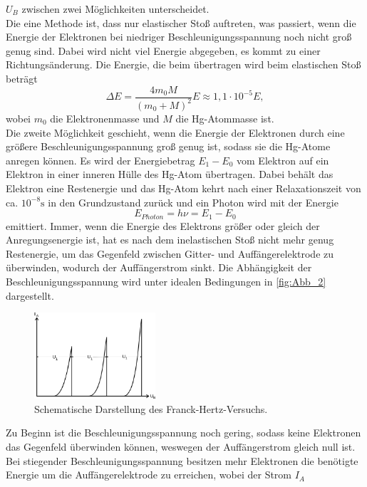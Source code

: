 $U_B$ zwischen zwei Möglichkeiten unterscheidet.\\
Die eine Methode ist, dass nur elastischer Stoß auftreten, was passiert, wenn die Energie der Elektronen bei niedriger Beschleunigungsspannung noch nicht groß genug sind.
Dabei wird nicht viel Energie abgegeben, es kommt zu einer Richtungsänderung. Die Energie, die beim übertragen wird beim elastischen Stoß beträgt
\begin{equation}
    \Delta E = \frac{4m_0M}{(m_0 + M)^2} E \approx 1,1 \cdot 10^{-5} E,
\end{equation}
wobei $m_0$ die Elektronenmasse und $M$ die Hg-Atommasse ist.\\
Die zweite Möglichkeit geschieht, wenn die Energie der Elektronen durch eine größere Beschleunigungsspannung groß genug ist, 
sodass sie die Hg-Atome anregen können. Es wird der Energiebetrag $E_1-E_0$ vom Elektron auf ein Elektron in einer inneren Hülle des Hg-Atom übertragen.
Dabei behält das Elektron eine Restenergie und das Hg-Atom kehrt nach einer Relaxationszeit von ca. $10^{-8}\si{\second}$ in den Grundzustand zurück 
und ein Photon wird mit der Energie
\begin{equation}
    E_{Photon} = h \nu = E_1 - E_0
    \label{eqn:Anregungspotential}
\end{equation}
emittiert.
Immer, wenn die Energie des Elektrons größer oder gleich der Anregungsenergie ist, hat
es nach dem inelastischen Stoß nicht mehr genug Restenergie, um das Gegenfeld zwischen
Gitter- und Auffängerelektrode zu überwinden, wodurch der Auffängerstrom sinkt.
Die Abhängigkeit der Beschleunigungsspannung wird unter idealen Bedingungen in \autoref{fig:Abb_2} dargestellt.
\begin{figure}[H]
    \centering
    \includegraphics[width=0.4\textwidth]{build/Abb_2.png}
    \caption{Schematische Darstellung des Franck-Hertz-Versuchs\cite{V601}.}
    \label{fig:Abb_2}
\end{figure}
Zu Beginn ist die Beschleunigungsspannung noch gering, sodass keine Elektronen das Gegenfeld überwinden können, weswegen der Auffängerstrom gleich 
null ist. Bei stiegender Beschleunigungsspannung besitzen mehr Elektronen die benötigte Energie um die Auffängerelektrode zu erreichen, wobei der Strom $I_A$
